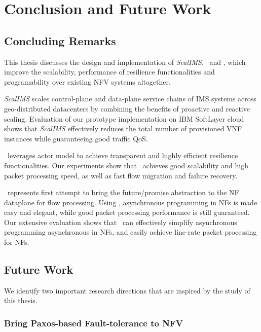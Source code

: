 \chapter {Conclusion and Future Work}
\label{ch:conclusion}

\section {Concluding Remarks}

This thesis discusses the design and implementation of \textit{ScalIMS}, \nfactor~and \netstar, which improve the scalability, performance of resilience functionalities and programability over existing NFV systems altogether.

\textit{ScalIMS} scales control-plane and data-plane service chains of IMS systems across geo-distributed datacenters by combining the benefits of proactive and reactive scaling. Evaluation of our prototype implementation on IBM SoftLayer cloud shows that \textit{ScalIMS} effectively reduces the total number of provisioned VNF instances while guaranteeing good traffic QoS.

\nfactor~leverages actor model to achieve transparent and highly efficient resilience functionalities. Our experiments show that \nfactor~achieves good scalability and high packet processing speed, as well as fast flow migration and failure recovery.

\netstar~represents first attempt to bring the future/promise abstraction to the NF dataplane for flow processing. Using \netstar, asynchronous programming in NFs is made easy and elegant, while good packet processing performance is still guaranteed. Our extensive evaluation shows that \netstar~can effectively simplify asynchronous programming asynchronous in NFs, and easily achieve line-rate packet processing for NFs.

\section {Future Work}

We identify two important research directions that are inspired by the study of this thesis.

\subsection{Bring Paxos-based Fault-tolerance to NFV}

